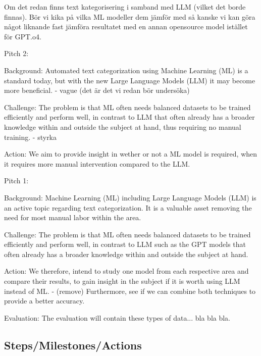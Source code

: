 \documentclass{article}
\begin{document}
Om det redan finns text kategorisering i samband med LLM (vilket det borde finnas).
Bör vi kika på vilka ML modeller dem jämför med så kanske vi kan göra något liknande fast jämföra
resultatet med en annan opensource model istället för GPT.o4.

Pitch 2:

Background:
Automated text categorization using Machine Learning (ML) is a standard today, but with the new
Large Language Models (LLM) it may become more beneficial. - vague (det är det vi redan bör undersöka)

Challenge:
The problem is that ML often needs balanced datasets to be trained efficiently and perform well,
in contrast to LLM that often already has a broader knowledge within and outside the subject at hand,
thus requiring no manual training. - styrka

Action:
We aim to provide insight in wether or not a ML model is required, when it requires more manual
intervention compared to the LLM.


Pitch 1:

Background:
Machine Learning (ML) including Large Language Models (LLM) is an active topic regarding text
categorization. It is a valuable asset removing the need for most manual labor within the area.

Challenge:
The problem is that ML often needs balanced datasets to be trained efficiently and perform well,
in contrast to LLM such as the GPT models that often already has a broader knowledge within and
outside the subject at hand.

Action:
We therefore, intend to study one model from each respective area and compare their results,
to gain insight in the subject if it is worth using LLM instead of ML.
- (remove) Furthermore, see if we can combine both techniques to provide a better accuracy.

Evaluation:
The evaluation will contain these types of data... bla bla bla.

\subsection{Steps/Milestones/Actions}
\end{document}
